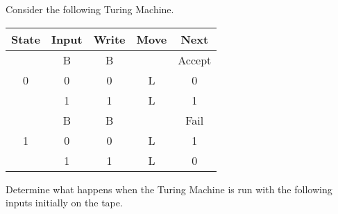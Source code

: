

\begin{questions}

\question
Consider the following Turing Machine.

\begin{table}[H]
  \centering
  \begin{tabular}{ccccc}
    \toprule
    State	& Input	& Write & Move & Next \\
    \midrule
    \multirow{3}{*}{0} 
    	& B & B &  & Accept \\
      & 0 & 0 & L & 0 \\
      & 1 & 1 & L & 1 \\
    \midrule
    \multirow{3}{*}{1}
    	 & B & B &  & Fail \\
       & 0 & 0 & L & 1 \\
       & 1 & 1 & L & 0 \\
    \bottomrule
    \hline
  \end{tabular}
\end{table}
Determine what happens when the Turing Machine is run with the following inputs initially on the tape.
\begin{parts}
  \part 0001
  \part 0111
  \part 0110
  \part 0101010001
  \part 00000000000000111
  \part 00
  \part 
\end{parts}


\begin{solution}
\begin{parts}

\end{parts}
\end{solution}
\end{questions}
